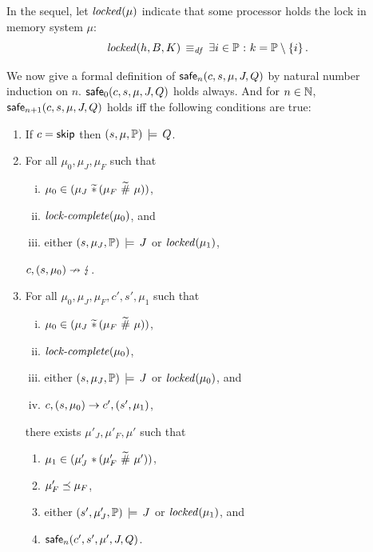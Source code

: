 \documentclass[11pt]{report}
\begin{document}
In the sequel, let $\mathit{locked}(\mu)$ indicate that some processor holds the lock in memory system $\mu$: \[ \mathit{locked}(h,B,K) \operatorname{\;\equiv_{\mathit{df}}\;} \exists i \in \mathbb{P} \operatorname{\,:\,} k = \mathbb{P} \setminus \left\lbrace i \right\rbrace. \]

We now give a formal definition of $\mathsf{safe}_{n}(c,s,\mu,J,Q)$ by natural number induction on $n$. $\mathsf{safe}_{0}(c,s,\mu,J,Q)$ holds always. And for $n \in \mathbb{N}$, $\mathsf{safe}_{n+1}(c,s,\mu,J,Q)$ holds iff the following conditions are true: \begin{enumerate}
  \item If $c = \operatorname{\mathsf{skip}}$ then $(s,\mu,\mathbb{P}) \,\models\, Q$.

  \item For all $\mu_0,\mu_J,\mu_F$ such that \begin{enumerate}[(i)]
    \item $\mu_0 \in (\mu_J \operatorname{\,\widetilde{\ast}\,} (\mu_F \operatorname{\,\widetilde{\#}\,} \mu))$,
    \item $\text{\textit{lock-complete}}(\mu_0)$, and
    \item either $(s,\mu_J,\mathbb{P}) \,\models\, J$ or $\mathit{locked}(\mu_1)$,
  \end{enumerate} $c,(s,\mu_0) \nrightarrow \lightning$.

  \item For all $\mu_0,\mu_J,\mu_F,c',s',\mu_1$ such that \begin{enumerate}[(i)]
    \item $\mu_0 \in (\mu_J \operatorname{\,\widetilde{\ast}\,} (\mu_F \operatorname{\,\widetilde{\#}\,} \mu))$,
    \item $\text{\textit{lock-complete}}(\mu_0)$,
    \item either $(s,\mu_J,\mathbb{P}) \,\models\, J$ or $\mathit{locked}(\mu_0)$, and 
    \item $c,(s,\mu_0) \rightarrow c',(s',\mu_1)$,
  \end{enumerate} there exists $\mu'_J,\mu'_F,\mu'$ such that \begin{enumerate}
    \item $\mu_1 \in (\mu'_J \operatorname{\,\ast\,} (\mu'_F \operatorname{\,\widetilde{\#}\,} \mu'))$,
    \item $\mu'_F \preceq \mu_F$,
    \item either $(s',\mu'_J,\mathbb{P}) \,\models\, J$ or $\mathit{locked}(\mu_1)$, and
    \item $\mathsf{safe}_{n}(c',s',\mu',J,Q)$.
  \end{enumerate}

\end{enumerate}
\end{document}
